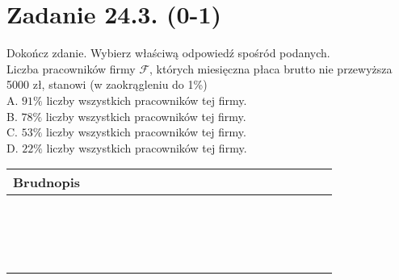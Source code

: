 \documentclass[10pt]{article}
\begin{document}
\section*{Zadanie 24.3. (0-1)}
Dokończ zdanie. Wybierz właściwą odpowiedź spośród podanych.\\
Liczba pracowników firmy \(\mathcal{F}\), których miesięczna płaca brutto nie przewyższa\\
5000 zł, stanowi (w zaokrągleniu do 1\%)\\
A. \(91 \%\) liczby wszystkich pracowników tej firmy.\\
B. \(78 \%\) liczby wszystkich pracowników tej firmy.\\
C. \(53 \%\) liczby wszystkich pracowników tej firmy.\\
D. \(22 \%\) liczby wszystkich pracowników tej firmy.

\begin{center}
\begin{tabular}{|c|c|c|c|c|c|c|c|c|c|c|c|c|c|c|c|c|c|c|c|c|c|c|}
\hline
\multicolumn{4}{|l|}{Brudnopis} &  &  &  &  &  &  &  &  &  &  &  &  &  &  &  &  &  &  &  \\
\hline
 &  &  &  &  &  &  &  &  &  &  &  &  &  &  &  &  &  &  &  &  &  &  \\
\hline
 &  &  &  &  &  &  &  &  &  &  &  &  &  &  &  &  &  &  &  &  &  &  \\
\hline
 &  &  &  &  &  &  &  &  &  &  &  &  &  &  &  &  &  &  &  &  &  &  \\
\hline
 &  &  &  &  &  &  &  &  &  &  &  &  &  &  &  &  &  &  &  &  &  &  \\
\hline
 &  &  &  &  &  &  &  &  &  &  &  &  &  &  &  &  &  &  &  &  &  &  \\
\hline
 &  &  &  &  &  &  &  &  &  &  &  &  &  &  &  &  &  &  &  &  &  &  \\
\hline
 &  &  &  &  &  &  &  &  &  &  &  &  &  &  &  &  &  &  &  &  &  &  \\
\hline
 &  &  &  &  &  &  &  &  &  &  &  &  &  &  &  &  &  &  &  &  &  &  \\
\hline
 &  &  &  &  &  &  &  &  &  &  &  &  &  &  &  &  &  &  &  &  &  &  \\
\hline
 &  &  &  &  &  &  &  &  &  &  &  &  &  &  &  &  &  &  &  &  &  &  \\
\hline
 &  &  &  &  &  &  &  &  &  &  &  &  &  &  &  &  &  &  &  &  &  &  \\
\hline
 &  &  &  &  &  &  &  &  &  &  &  &  &  &  &  &  &  &  &  &  &  &  \\
\hline
 &  &  &  &  &  &  &  &  &  &  &  &  &  &  &  &  &  &  &  &  &  &  \\
\hline
 &  &  &  &  &  &  &  &  &  &  &  &  &  &  &  &  &  &  &  &  &  &  \\
\hline
 &  &  &  &  &  &  &  &  &  &  &  &  &  &  &  &  &  &  &  &  &  &  \\
\hline
 &  &  &  &  &  &  &  &  &  &  &  &  &  &  &  &  &  &  &  &  &  &  \\
\hline
\end{tabular}
\end{center}
\end{document}
